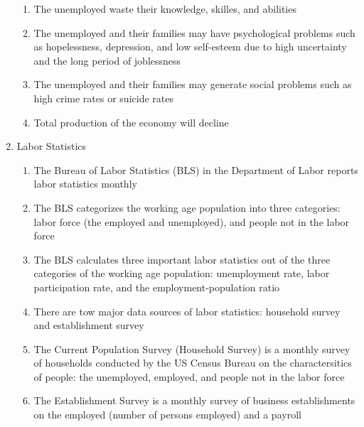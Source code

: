 \documentclass[12pt]{article}
\begin{document}
\begin{enumerate}
\begin{enumerate}
          \item The unemployed waste their knowledge, skilles, and abilities

          \item The unemployed and their families may have psychological problems such as hopelessness, depression, and low self-esteem due to high uncertainty and the long period of joblessness

          \item The unemployed and their families may generate social problems such as high crime rates or suicide rates

          \item Total production of the economy will decline

        \end{enumerate}

      \item Labor Statistics

        \begin{enumerate}

          \item The Bureau of Labor Statistics (BLS) in the Department of Labor reports labor statistics monthly

          \item The BLS categorizes the working age population into three categories: labor force (the employed and unemployed), and people not in the labor force

          \item The BLS calculates three important labor statistics out of the three categories of the working age population: unemployment rate, labor participation rate, and the employment-population ratio

          \item There are tow major data sources of labor statistics: household survey and establishment survey

          \item The Current Population Survey (Household Survey) is a monthly survey of households conducted by the US Census Bureau on the charactersitics of people: the unemployed, employed, and people not in the labor force

          \item The Establishment Survey is a monthly survey of business establishments on the employed (number of persons employed) and a payroll

        \end{enumerate}


\end{enumerate}
\end{document}
